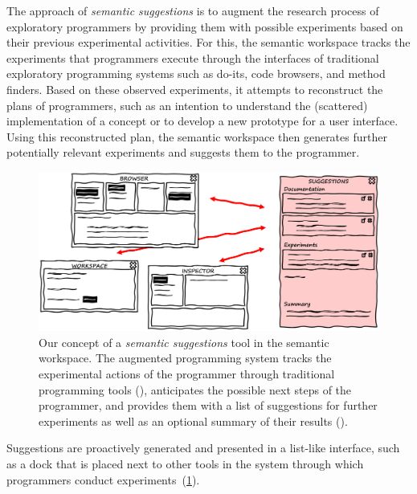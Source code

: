 The approach of \emph{semantic suggestions} is to augment the research process of exploratory programmers by providing them with possible experiments based on their previous experimental activities.
For this, the semantic workspace tracks the experiments that programmers execute through the interfaces of traditional exploratory programming systems such as do-its, code browsers, and method finders.
Based on these observed experiments, it attempts to reconstruct the plans of programmers, such as an intention to understand the (scattered) implementation of a concept or to develop a new prototype for a user interface.
Using this reconstructed plan, the semantic workspace then generates further potentially relevant experiments and suggests them to the programmer.

\begin{figure}
	\centering
	\includegraphics[width=\textwidth]{02_workspace/suggestions.png}
	\caption[Our concept of a \emph{semantic suggestions} tool in the semantic workspace.]{
		Our concept of a \emph{semantic suggestions} tool in the semantic workspace.
		The augmented programming system tracks the experimental actions of the programmer through traditional programming tools (\bold{\textcolor{gray}{gray}}), anticipates the possible next steps of the programmer, and provides them with a list of suggestions for further experiments as well as an optional summary of their results (\bold{\textcolor[HTML]{c00000}{red}}).
	}
	\label{fig:approach/workspace/suggestions}
\end{figure}

Suggestions are proactively generated and presented in a list-like interface, such as a dock that is placed next to other tools in the system through which programmers conduct experiments~(\cref{fig:approach/workspace/suggestions}).

